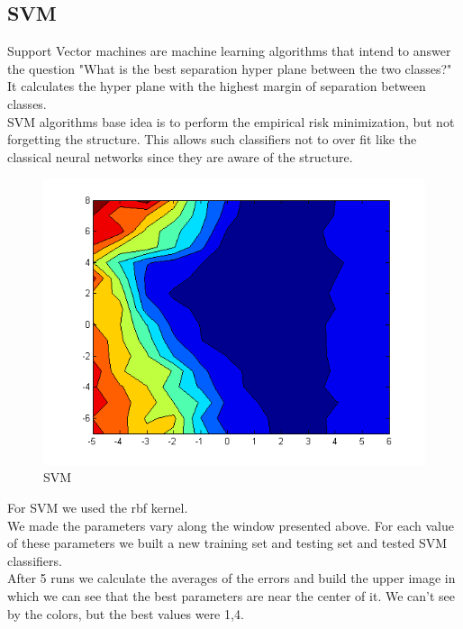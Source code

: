 \documentclass[english, a4paper, 12pt]{article}
\newcommand{\tab}{\hspace*{2em}}
\begin{document}
\pagebreak
\subsection{SVM}
\tab Support Vector machines are machine learning algorithms that intend to answer the question "What is the best separation hyper plane between the two classes?"\smallskip\\
\tab It calculates the hyper plane with the highest margin of separation between classes.\smallskip\\
\tab SVM algorithms base idea is to perform the empirical risk minimization, but not forgetting the structure. This allows such classifiers not to over fit like the classical neural networks since they are aware of the structure.
\begin{figure}[H]
	\centering
	\includegraphics[scale= 0.5]{svm_parameter.png}
	\caption{SVM}
\end{figure}
\tab For SVM we used the rbf kernel.\smallskip\\
\tab We made the parameters vary along the window presented above. For each value of these parameters we built a new training set and testing set and tested SVM classifiers.\smallskip\\
\tab After 5 runs we calculate the averages of the errors and build the upper image in which we can see that the best parameters are near the center of it. We can’t see by the colors, but the best values were 1,4.
\end{document}

